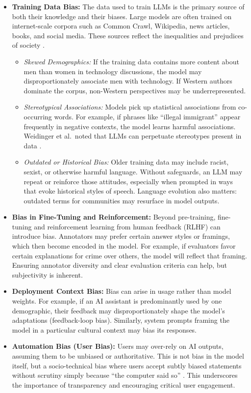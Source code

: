\begin{itemize}
    \item \textbf{Training Data Bias:} The data used to train LLMs is the primary source of both their knowledge and their biases. Large models are often trained on internet-scale corpora such as Common Crawl, Wikipedia, news articles, books, and social media. These sources reflect the inequalities and prejudices of society \cite{ar5iv_labs}.
    \begin{itemize}
        \item \emph{Skewed Demographics:} If the training data contains more content about men than women in technology discussions, the model may disproportionately associate men with technology. If Western authors dominate the corpus, non-Western perspectives may be underrepresented.
        \item \emph{Stereotypical Associations:} Models pick up statistical associations from co-occurring words. For example, if phrases like ``illegal immigrant'' appear frequently in negative contexts, the model learns harmful associations. Weidinger et al.\ noted that LLMs can perpetuate stereotypes present in data \cite{ar5iv_labs}.
        \item \emph{Outdated or Historical Bias:} Older training data may include racist, sexist, or otherwise harmful language. Without safeguards, an LLM may repeat or reinforce those attitudes, especially when prompted in ways that evoke historical styles of speech. Language evolution also matters: outdated terms for communities may resurface in model outputs.
    \end{itemize}

    \item \textbf{Bias in Fine-Tuning and Reinforcement:} Beyond pre-training, fine-tuning and reinforcement learning from human feedback (RLHF) can introduce bias. Annotators may prefer certain answer styles or framings, which then become encoded in the model. For example, if evaluators favor certain explanations for crime over others, the model will reflect that framing. Ensuring annotator diversity and clear evaluation criteria can help, but subjectivity is inherent.

    \item \textbf{Deployment Context Bias:} Bias can arise in usage rather than model weights. For example, if an AI assistant is predominantly used by one demographic, their feedback may disproportionately shape the model's adaptations (feedback-loop bias). Similarly, system prompts framing the model in a particular cultural context may bias its responses.

    \item \textbf{Automation Bias (User Bias):} Users may over-rely on AI outputs, assuming them to be unbiased or authoritative. This is not bias in the model itself, but a socio-technical bias where users accept subtly biased statements without scrutiny simply because ``the computer said so'' \cite{euai2025}. This underscores the importance of transparency and encouraging critical user engagement.
\end{itemize}

